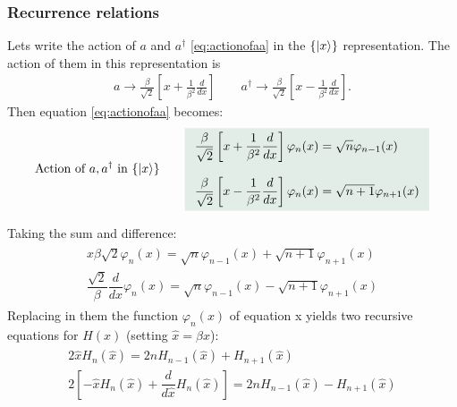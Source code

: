 \subsubsection{Recurrence relations}
Lets write the action of $a$ and $a^\dagger$ \eqref{eq:actionofaa} in the $\{|x\rangle\}$ representation. The action of them 
in this representation is 
\begin{align}
    a\longrightarrow \frac{\beta}{\sqrt{2}}\left[x+\frac{1}{\beta^2}\frac{d}{dx}\right]\qquad a^\dagger\longrightarrow\frac{\beta}{\sqrt{2}}\left[x-\frac{1}{\beta^2}\frac{d}{dx}\right].
\end{align}
Then equation \eqref{eq:actionofaa} becomes:
\begin{align}
    \text{Action of $a,a^\dagger$ in $\{\ket{x}\}$}\qquad\highlight{
        \begin{array}{l}
            \dfrac{\beta}{\sqrt{2}}\left[x+\dfrac{1}{\beta^2}\dfrac{d}{dx}\right]\varphi_n(x)=\sqrt{n}\varphi_{n-1}(x)\\\\
            \dfrac{\beta}{\sqrt{2}}\left[x-\dfrac{1}{\beta^2}\dfrac{d}{dx}\right]\varphi_n(x)=\sqrt{n+1}\varphi_{n+1}(x)
        \end{array}}
\end{align}

Taking the sum and difference:
\begin{align*}
    \begin{array}{l}
        x\beta\sqrt{2}\varphi_n(x)=\sqrt{n}\varphi_{n-1}(x)+\sqrt{n+1}\varphi_{n+1}(x)\\
        \dfrac{\sqrt{2}}{\beta}\dfrac{d}{dx}\varphi_n(x)=\sqrt{n}\varphi_{n-1}(x)-\sqrt{n+1}\varphi_{n+1}(x)
    \end{array}
\end{align*}
Replacing in them the function $\varphi_n(x)$ of equation x yields two recursive equations for $H(x)$ (setting $\hat{x}=\beta x$):
\begin{align*}
    \begin{array}{l}
        2\hat{x}H_n(\hat{x})=2nH_{n-1}(\hat{x})+H_{n+1}(\hat{x})\\
        2\left[-\hat{x}H_n(\hat{x})+\dfrac{d}{d\hat{x}}H_n(\hat{x})\right]=2nH_{n-1}(\hat{x})-H_{n+1}(\hat{x})
    \end{array}
\end{align*}